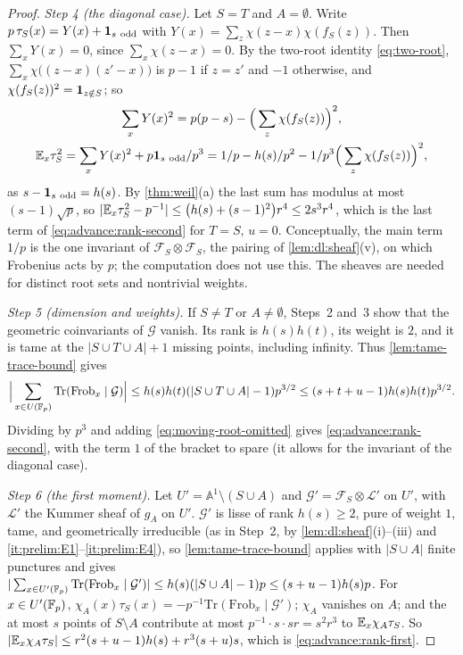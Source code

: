 \begin{proof}
\emph{Step 4 (the diagonal case).} Let $S=T$ and $A=\emptyset$. Write
$p\,\tau_S(x)=Y(x)+\mathbf 1_{s\ \rm odd}$ with $Y(x)=\sum_z\chi(z-x)\chi(f_S(z))$.
Then $\sum_xY(x)=0$, since $\sum_x\chi(z-x)=0$. By the two-root identity
\eqref{eq:two-root}, $\sum_x\chi\big((z-x)(z'-x)\big)$ is $p-1$ if $z=z'$ and
$-1$ otherwise, and $\chi(f_S(z))^2=\mathbf 1_{z\notin S}$; so
\begin{gather*}
  \sum_xY(x)^2=p(p-s)-\Big(\sum_z\chi(f_S(z))\Big)^2,\\
  \mathbb E_x\tau_S^2=\sum_xY(x)^2+p\mathbf 1_{s\ \rm odd}/p^3
  =1/p-h(s)/p^2-1/p^3\Big(\sum_z\chi(f_S(z))\Big)^2,
\end{gather*}
as $s-\mathbf 1_{s\ \rm odd}=h(s)$. By \cref{thm:weil}(a) the last sum has modulus at
most $(s-1)\sqrt p$, so
$|\mathbb E_x\tau_S^2-p^{-1}|\le\big(h(s)+(s-1)^2\big)r^4\le2s^3r^4$, which is the last
term of \eqref{eq:advance:rank-second} for $T=S$, $u=0$. Conceptually, the main
term $1/p$ is the one invariant of $\mathcal F_S\otimes\mathcal F_S$, the pairing
of \cref{lem:dl:sheaf}(v), on which Frobenius acts by $p$; the computation does
not use this. The sheaves are needed for distinct root sets and nontrivial
weights.

\emph{Step 5 (dimension and weights).} If $S\ne T$ or $A\ne\emptyset$,
Steps~2 and~3 show that the geometric coinvariants of $\mathcal G$ vanish.
Its rank is $h(s)h(t)$, its weight is $2$, and it is tame at the
$|S\cup T\cup A|+1$ missing points, including infinity. Thus
\cref{lem:tame-trace-bound} gives
\[
 \Big|\sum_{x\in U(\mathbb F_p)}\mathrm{Tr}(\mathrm{Frob}_x\mid\mathcal G)\Big|
 \le h(s)h(t)(|S\cup T\cup A|-1)p^{3/2}
 \le(s+t+u-1)h(s)h(t)p^{3/2}.
\]
Dividing by $p^3$ and adding \eqref{eq:moving-root-omitted} gives
\eqref{eq:advance:rank-second}, with the term $1$ of the bracket to spare
(it allows for the invariant of the diagonal case).

\emph{Step 6 (the first moment).} Let $U'=\mathbb A^1\setminus(S\cup A)$ and
$\mathcal G'=\mathcal F_S\otimes\mathcal L'$ on $U'$, with $\mathcal L'$ the Kummer
sheaf of $g_A$ on $U'$. $\mathcal G'$ is lisse of rank $h(s)\ge2$, pure of weight
$1$, tame, and geometrically irreducible (as in Step~2, by
\cref{lem:dl:sheaf}(i)--(iii) and \ref{it:prelim:E1}--\ref{it:prelim:E4}), so \cref{lem:tame-trace-bound} applies with $|S\cup A|$ finite punctures and
gives
$|\sum_{x\in U'(\mathbb F_p)}\mathrm{Tr}(\mathrm{Frob}_x\mid\mathcal G')|
\le h(s)(|S\cup A|-1)p\le(s+u-1)h(s)p$.
For $x\in U'(\mathbb F_p)$,
$\chi_A(x)\tau_S(x)=-p^{-1}\mathrm{Tr}(\mathrm{Frob}_x\mid\mathcal G')$; $\chi_A$
vanishes on $A$; and the at most $s$ points of $S\setminus A$ contribute at
most $p^{-1}\cdot s\cdot sr=s^2r^3$ to $\mathbb E_x\chi_A\tau_S$. So
$|\mathbb E_x\chi_A\tau_S|\le r^2(s+u-1)h(s)+r^3(s+u)s$, which is
\eqref{eq:advance:rank-first}.
\end{proof}

